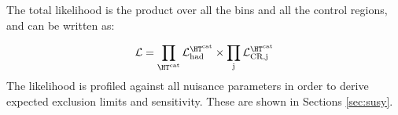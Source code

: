The total likelihood is the product over all the \htcat bins and all the control regions, and can be written as:

\begin{equation}
\label{eq:total_likelihood}
\mathcal{L} = \prod_{\htcat} \mathcal{L}_{\text{had}}^{\htcat} \times \prod_{\text{j}} \mathcal{L}_{\text{CR,j}}^{\htcat}
\end{equation}
The likelihood is profiled against all nuisance parameters in order to derive expected exclusion limits and sensitivity. 
These are shown in Sections \ref{sec:susy}. 




